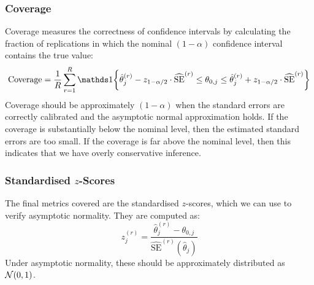 \subsubsection{Coverage}
Coverage measures the correctness of confidence intervals by calculating the fraction of replications in which the nominal $(1-\alpha)$ confidence interval contains the true value:
\begin{equation}
    \text{Coverage} = \frac{1}{R}\sum_{r=1}^{R}\one\!\left\{
    \hat\theta_j^{(r)} - z_{1-\alpha/2} \cdot \widehat{\text{SE}}^{(r)} \leq \theta_{0,j}
    \leq \hat\theta_j^{(r)} + z_{1-\alpha/2} \cdot \widehat{\text{SE}}^{(r)}
    \right\}
\end{equation}
Coverage should be approximately $(1-\alpha)$ when the standard errors are correctly calibrated and the asymptotic normal approximation holds. If the coverage is substantially below the nominal level, then the estimated standard errors are too small. If the coverage is far above the nominal level, then this indicates that we have overly conservative inference.

\subsubsection{Standardised $z$-Scores}
The final metrics covered are the standardised $z$-scores, which we can use to verify asymptotic normality. They are computed as:
\begin{equation}
\label{eq:mc_zscore_def}
    z_j^{(r)} = \frac{\hat\theta_j^{(r)} - \theta_{0,j}}{\widehat{\text{SE}}^{(r)}(\hat\theta_j)}
\end{equation}
Under asymptotic normality, these should be approximately distributed as $\mathcal{N}(0, 1)$.
